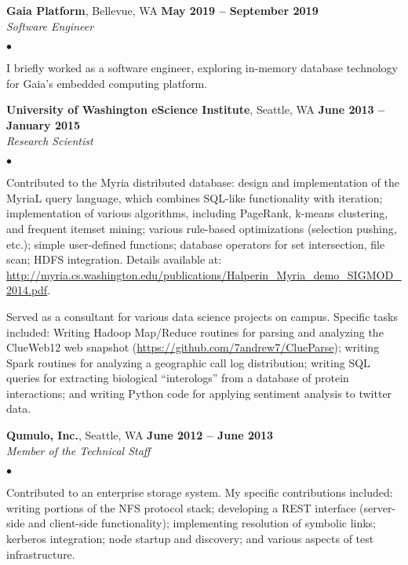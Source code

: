 \documentclass[margin,line]{res}
\newenvironment{list2}{
  \begin{list}{$\bullet$}{%
      \setlength{\itemsep}{0in}
      \setlength{\parsep}{0in} \setlength{\parskip}{0in}
      \setlength{\topsep}{0in} \setlength{\partopsep}{0in} 
      \setlength{\leftmargin}{0.2in}}}{\end{list}}
\begin{document}
\begin{resume}
\textbf{Gaia Platform}, Bellevue, WA \hfill \textbf{May 2019 -- September 2019} \\\vspace{-4mm}
\textsl{Software Engineer} \\
\begin{list2}
  \item I briefly worked as a software engineer, exploring in-memory database technology for Gaia's 
    embedded computing platform.
\end{list2}


\textbf{University of Washington eScience Institute}, Seattle, WA \hfill \textbf{June 2013 -- January 2015} \\\vspace{-4mm}
\textsl{Research Scientist} \\
\begin{list2}
\item Contributed to the Myria distributed database: design and implementation of the MyriaL query language, which combines SQL-like functionality with iteration; implementation of various algorithms, including PageRank, k-means clustering, and frequent itemset mining; various rule-based optimizations (selection pushing, etc.); simple user-defined functions; database operators for set intersection, file scan; HDFS integration.  Details available at:\\
\url{http://myria.cs.washington.edu/publications/Halperin_Myria_demo_SIGMOD_2014.pdf}.

\item Served as a consultant for various data science projects on campus.  Specific tasks included: Writing Hadoop Map/Reduce routines for parsing and analyzing the ClueWeb12 web snapshot (\url{https://github.com/7andrew7/ClueParse}); writing Spark routines for analyzing a geographic call log distribution; writing SQL queries for extracting biological ``interologs'' from a database of protein interactions; and writing Python code for applying sentiment analysis to twitter data.
\end{list2}

\textbf{Qumulo, Inc.}, Seattle, WA \hfill \textbf{June 2012 -- June 2013} \\\vspace{-4mm}
\textsl{Member of the Technical Staff}  \\
\begin{list2}
  \item Contributed to an enterprise storage system.  My specific contributions included: writing
    portions of the NFS protocol stack; developing a REST interface (server-side and client-side functionality); implementing resolution of symbolic links; kerberos
    integration; node startup and discovery; and various aspects of test infrastructure.
  \end{list2}


\end{resume}
\end{document}

